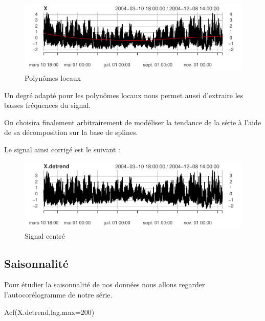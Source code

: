 \documentclass[
]{article}
\newenvironment{Shaded}{\begin{snugshade}}{\end{snugshade}}
\newcommand{\AttributeTok}[1]{\textcolor[rgb]{0.77,0.63,0.00}{#1}}
\newcommand{\DecValTok}[1]{\textcolor[rgb]{0.00,0.00,0.81}{#1}}
\newcommand{\FunctionTok}[1]{\textcolor[rgb]{0.00,0.00,0.00}{#1}}
\newcommand{\NormalTok}[1]{#1}
\begin{document}
\begin{figure}

{\centering \includegraphics{STA202_report_files/figure-latex/polynoms-1} 

}

\caption{\label{fig:polynoms} Polynômes locaux}\label{fig:polynoms}
\end{figure}

Un degré adapté pour les polynômes locaux nous permet aussi d'extraire
les basses fréquences du signal.

On choisira finalement arbitrairement de modéliser la tendance de la
série à l'aide de sa décomposition sur la base de splines.

Le signal ainsi corrigé est le suivant :

\begin{figure}

{\centering \includegraphics{STA202_report_files/figure-latex/splines.center-1} 

}

\caption{\label{fig:splines.center} Signal centré}\label{fig:splines.center}
\end{figure}

\hypertarget{saisonnalituxe9}{%
\subsection{Saisonnalité}\label{saisonnalituxe9}}

Pour étudier la saisonnalité de nos données nous allons regarder
l'autocorélogramme de notre série.

\begin{Shaded}
\begin{Highlighting}[]
\FunctionTok{Acf}\NormalTok{(X.detrend,}\AttributeTok{lag.max=}\DecValTok{200}\NormalTok{)}
\end{Highlighting}
\end{Shaded}
\end{document}
